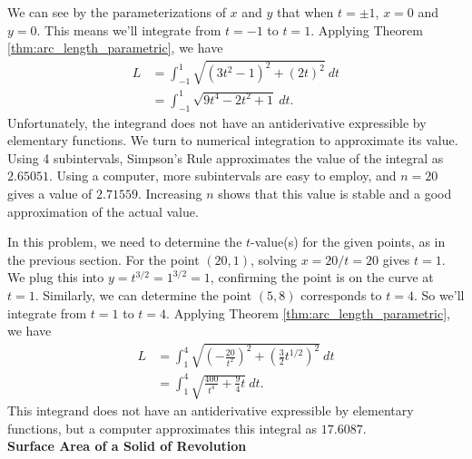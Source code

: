 {We can see by the parameterizations of $x$ and $y$ that when $t=\pm 1$, $x=0$ and $y=0$. This means we'll integrate from $t=-1$ to $t=1$. Applying Theorem \ref{thm:arc_length_parametric}, we have
\begin{align*}
L 	&= \int_{-1}^1\sqrt{(3t^2-1)^2+(2t)^2}\ dt\\
		&=	\int_{-1}^1 \sqrt{9t^4-2t^2+1} \ dt.
\end{align*}
Unfortunately, the integrand does not have an antiderivative expressible by elementary functions. We turn to numerical integration to approximate its value. Using 4 subintervals, Simpson's Rule approximates the value of the integral as $2.65051$. Using a computer, more subintervals are easy to employ, and $n=20$ gives a value of $2.71559$. Increasing $n$ shows that this value is stable and a good approximation of the actual value.
}\\
\clearpage

{In this problem, we need to determine the $t$-value(s) for the given points, as in the previous section.  For the point $(20,1)$, solving $x=20/t=20$ gives $t=1$.  We plug this into $y=t^{3/2}=1^{3/2}=1$, confirming the point is on the curve at $t=1$.  Similarly, we can determine the point $(5,8)$ corresponds to $t=4$.  So we'll integrate from $t=1$ to $t=4$. Applying Theorem \ref{thm:arc_length_parametric}, we have
\begin{align*}
L 	&= \int_{1}^{4}\sqrt{\left(-\frac{20}{t^2}\right)^2+\left(\frac{3}{2}t^{1/2}\right)^2}\ dt\\
		&=	\int_{1}^{4}\sqrt{\frac{400}{t^4}+\frac{9}{4}t} \ dt.
\end{align*}
This integrand does not have an antiderivative expressible by elementary functions, but a computer approximates this integral as $17.6087$.
}\\

\noindent\textbf{\large Surface Area of a Solid of Revolution}\\

